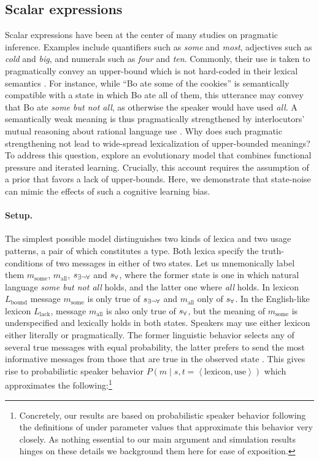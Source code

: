 \documentclass[10pt,a4paper]{article}
\newcommand{\tuple}[1]{\ensuremath{\left\langle #1 \right\rangle}}
\newcommand{\state}{\ensuremath{s}\xspace}		%
\newcommand{\mystate}[1]{\ensuremath{\state_{\text{#1}}}\xspace} %
\newcommand{\messg}{\ensuremath{m}\xspace}		%
\newcommand{\mymessg}[1]{\ensuremath{\messg_{\text{#1}}}\xspace} %
\newcommand{\ssome}{\mystate{\ensuremath{\exists\neg\forall}}}
\newcommand{\sall}{\mystate{\ensuremath{\forall}}}
\newcommand{\msome}{\mymessg{some}}
\newcommand{\mall}{\mymessg{all}}
\begin{document}
\subsection{Scalar expressions}
Scalar expressions have been at the center of many studies on pragmatic inference. Examples
include quantifiers such as {\em some} and {\em most}, adjectives such as {\em cold} and {\em
  big}, and numerals such as {\em four} and {\em ten}. Commonly, their use is taken to
pragmatically convey an upper-bound which is not hard-coded in their lexical semantics
\citep{horn:1972,gazdar:1979}. For instance, while ``Bo ate some of the cookies'' is
semantically compatible with a state in which Bo ate all of them, this utterance may convey
that Bo ate {\em some but not all}, as otherwise the speaker would have used {\em all}. A
semantically weak meaning is thus pragmatically strengthened by interlocutors' mutual reasoning
about rational language use \citep{grice:1975}. Why does such pragmatic strengthening not lead
to wide-spread lexicalization of upper-bounded meanings? To address this question, \citet{brochhagen+etal:2016:CogSci}
explore an evolutionary model that combines functional pressure and iterated learning.
Crucially, this account requires the assumption of a prior that favors a lack of
upper-bounds. Here, we demonstrate that state-noise can mimic the effects of such a cognitive
learning bias.

\paragraph{Setup.} The simplest possible model distinguishes two kinds of lexica and two
usage patterns, a pair of which constitutes a type. Both lexica specify the
truth-conditions of two messages in either of two states. Let us mnemonically label them
$\msome$, $\mall$, $\ssome$ and $\sall$, where the former state is one in which natural
language {\em some but not all} holds, and the latter one where {\em all} holds. In lexicon
$L_{\text{bound}}$ message $\msome$ is only true of $\ssome$ and $\mall$ only of $\sall$. In
the English-like lexicon $L_{\text{lack}}$, message $\mall$ is also only true of $\sall$, but the
meaning of $\msome$ is underspecified and lexically holds in both states. Speakers may use
either lexicon either literally or pragmatically. The former linguistic behavior selects any of several true
messages with equal probability, the latter prefers to send the most informative messages from
those that are true in the observed state \citep{grice:1975}. This gives rise to probabilistic
speaker behavior $P(m \mid s,t= \tuple{\text{lexicon},\text{use}})$ which approximates the
following:\footnote{Concretely, our results are based on probabilistic speaker behavior
  following the definitions of \citet{brochhagen+etal:2016:CogSci} under parameter values that
  approximate this behavior very closely. As nothing essential to our main argument and
  simulation results hinges on these details we background them here for ease of
  exposition.}
\end{document}
